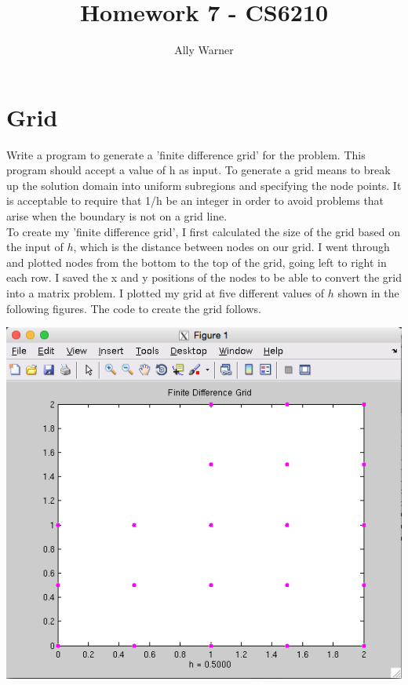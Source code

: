 \documentclass[11pt, oneside]{article}   	%
\title{Homework 7 - CS6210}
\author{Ally Warner}
\begin{document}
\maketitle
\section{Grid}

Write a program to generate a 'finite difference grid' for the problem. This program should accept a value of h as input. To generate a grid means to break up the solution domain into uniform subregions and specifying the node points. It is acceptable to require that 1/h be an integer in order to avoid problems that arise when the boundary is not on a grid line. \\

To create my 'finite difference grid', I first calculated the size of the grid based on the input of $h$, which is the distance between nodes on our grid. I went through and plotted nodes from the bottom to the top of the grid, going left to right in each row. I saved the x and y positions of the nodes to be able to convert the grid into a matrix problem. I plotted my grid at five different values of $h$ shown in the following figures. The code to create the grid follows. \\

\centerline{\includegraphics[scale = 0.55]{Grid_h1.png}}
\end{document}
